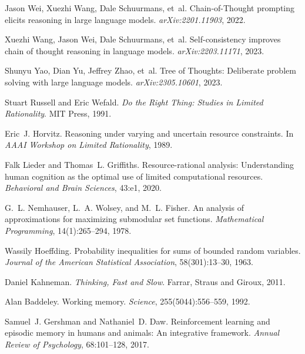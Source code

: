 \documentclass[11pt]{article}
\newcommand{\1}{\mathbb{I}}
\begin{document}

\begin{thebibliography}{10}

Jason Wei, Xuezhi Wang, Dale Schuurmans, et~al.
\newblock Chain-of-Thought prompting elicits reasoning in large language models.
\newblock \emph{arXiv:2201.11903}, 2022.

Xuezhi Wang, Jason Wei, Dale Schuurmans, et~al.
\newblock Self-consistency improves chain of thought reasoning in language models.
\newblock \emph{arXiv:2203.11171}, 2023.

Shunyu Yao, Dian Yu, Jeffrey Zhao, et~al.
\newblock Tree of Thoughts: Deliberate problem solving with large language models.
\newblock \emph{arXiv:2305.10601}, 2023.

Stuart Russell and Eric Wefald.
\newblock \emph{Do the Right Thing: Studies in Limited Rationality}.
\newblock MIT Press, 1991.

Eric~J. Horvitz.
\newblock Reasoning under varying and uncertain resource constraints.
\newblock In \emph{AAAI Workshop on Limited Rationality}, 1989.

Falk Lieder and Thomas~L. Griffiths.
\newblock Resource-rational analysis: Understanding human cognition as the optimal use of limited computational resources.
\newblock \emph{Behavioral and Brain Sciences}, 43:e1, 2020.

G.~L. Nemhauser, L.~A. Wolsey, and M.~L. Fisher.
\newblock An analysis of approximations for maximizing submodular set functions.
\newblock \emph{Mathematical Programming}, 14(1):265--294, 1978.

Wassily Hoeffding.
\newblock Probability inequalities for sums of bounded random variables.
\newblock \emph{Journal of the American Statistical Association}, 58(301):13--30, 1963.

Daniel Kahneman.
\newblock \emph{Thinking, Fast and Slow}.
\newblock Farrar, Straus and Giroux, 2011.

Alan Baddeley.
\newblock Working memory.
\newblock \emph{Science}, 255(5044):556--559, 1992.

Samuel~J. Gershman and Nathaniel~D. Daw.
\newblock Reinforcement learning and episodic memory in humans and animals: An integrative framework.
\newblock \emph{Annual Review of Psychology}, 68:101--128, 2017.


\end{thebibliography}
\end{document}
